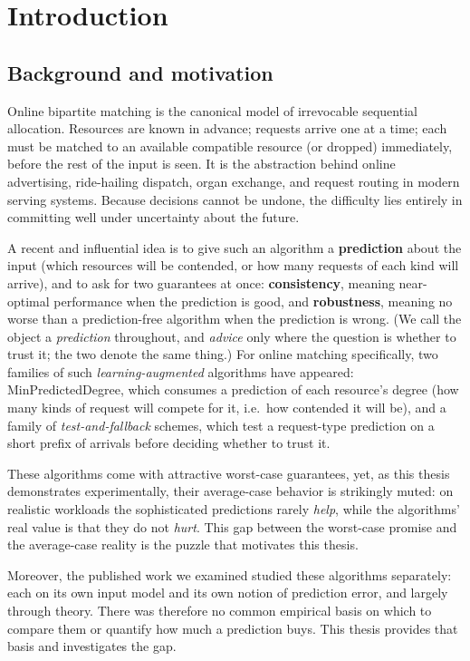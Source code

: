 \chapter{Introduction}

\section{Background and motivation}

Online bipartite matching is the canonical model of irrevocable
sequential allocation. Resources are known in advance; requests arrive
one at a time; each must be matched to an available compatible resource
(or dropped) immediately, before the rest of the input is seen. It is
the abstraction behind online advertising, ride-hailing dispatch, organ
exchange, and request routing in modern serving systems. Because
decisions cannot be undone, the difficulty lies entirely in committing
well under uncertainty about the future.

A recent and influential idea is to give such an algorithm a
\textbf{prediction} about the input (which resources will be contended,
or how many requests of each kind will arrive), and to ask for two
guarantees at once: \textbf{consistency}, meaning near-optimal
performance when the prediction is good, and \textbf{robustness},
meaning no worse than a prediction-free algorithm when the prediction is
wrong. (We call the object a \emph{prediction} throughout, and
\emph{advice} only where the question is whether to trust it; the two
denote the same thing.) For online matching specifically, two families
of such \emph{learning-augmented} algorithms have appeared:
MinPredictedDegree, which consumes a prediction of each resource's
degree (how many kinds of request will compete for it, i.e.~how
contended it will be), and a family of \emph{test-and-fallback} schemes,
which test a request-type prediction on a short prefix of arrivals
before deciding whether to trust it.

These algorithms come with attractive worst-case guarantees, yet, as
this thesis demonstrates experimentally, their average-case behavior is
strikingly muted: on realistic workloads the sophisticated predictions
rarely \emph{help}, while the algorithms' real value is that they do not
\emph{hurt}. This gap between the worst-case promise and the
average-case reality is the puzzle that motivates this thesis.

Moreover, the published work we examined studied these algorithms
separately: each on its own input model and its own notion of prediction
error, and largely through theory. There was therefore no common
empirical basis on which to compare them or quantify how much a
prediction buys. This thesis provides that basis and investigates the
gap.

